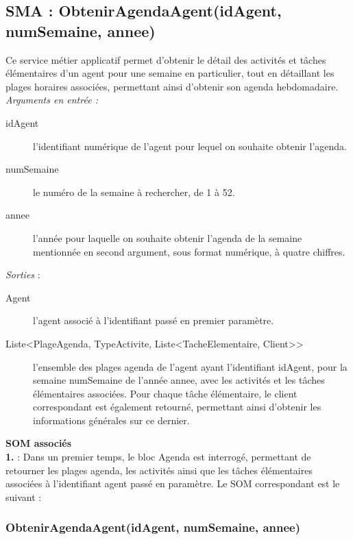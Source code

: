 \subsection{SMA : ObtenirAgendaAgent(idAgent, numSemaine, annee)}
Ce service métier applicatif permet d'obtenir le détail des activités et tâches élémentaires d'un agent pour une semaine en particulier, tout en détaillant les plages horaires associées, permettant ainsi d'obtenir son agenda hebdomadaire. \\

\noindent \textit{\textit{Arguments en entrée :}}
\begin{description}
\item[idAgent] l'identifiant numérique de  l'agent pour lequel on souhaite obtenir l'agenda. 
\item[numSemaine] le numéro de la semaine à rechercher, de 1 à 52. 
\item[annee] l'année pour laquelle on souhaite obtenir l'agenda de la semaine mentionnée en second argument, sous format numérique, à quatre chiffres. \\
\end{description}

\noindent \textit{Sorties} :

\begin{description}
\item[Agent] l'agent associé à l'identifiant passé en premier paramètre.
\item[Liste<PlageAgenda, TypeActivite, Liste<TacheElementaire, Client>>] l'ensemble des plages agenda de l'agent ayant l'identifiant idAgent, pour la semaine numSemaine de l'année annee, avec les activités et les tâches élémentaires associées. Pour chaque tâche élémentaire, le client correspondant est également retourné, permettant ainsi d'obtenir les informations générales sur ce dernier. \\
\end{description}

\begin{shaded}
\textbf{SOM associés}\\
\textbf{1.} : Dans un premier temps, le bloc Agenda est interrogé, permettant de retourner les plages agenda, les activités ainsi que les tâches élémentaires associées à l'identifiant agent passé en paramètre. Le SOM correspondant est le suivant : 
\end{shaded}

\subsubsection{ObtenirAgendaAgent(idAgent, numSemaine, annee)}

